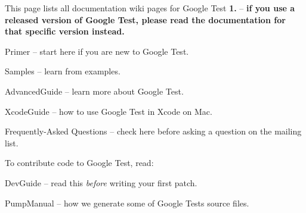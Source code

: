 This page lists all documentation wiki pages for Google Test {\bfseries{1.}} -- {\bfseries{if you use a released version of Google Test, please read the documentation for that specific version instead.}}


\begin{DoxyItemize}
\item Primer -- start here if you are new to Google Test.
\item Samples -- learn from examples.
\item Advanced\+Guide -- learn more about Google Test.
\item Xcode\+Guide -- how to use Google Test in Xcode on Mac.
\item Frequently-\/\+Asked Questions -- check here before asking a question on the mailing list.
\end{DoxyItemize}

To contribute code to Google Test, read\+:


\begin{DoxyItemize}
\item Dev\+Guide -- read this {\itshape before} writing your first patch.
\item Pump\+Manual -- how we generate some of Google Test\textquotesingle{}s source files. 
\end{DoxyItemize}